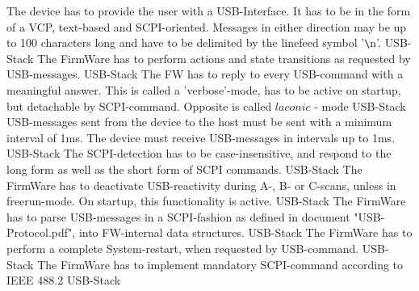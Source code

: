 	{	\scriptsize
		
	}





	{  The device has to provide the user with a USB-Interface. It has to be in the form of a VCP, text-based and SCPI-oriented.
		Messages in either direction may be up to 100 characters long and have to be delimited by the linefeed symbol '\texttt{\textbackslash}n'.	}
	{}{}{}{USB-Stack}
	{ The FirmWare has to perform actions and state transitions as requested by USB-messages.}
	{}{}{}{USB-Stack}
	{ The FW has to reply to every USB-command with a meaningful answer. This is called a 'verbose'-mode, has to be active on startup, but detachable by SCPI-command. Opposite is called $laconic$ - mode }
	{}{}{}{USB-Stack}
	{ USB-messages sent from the device to the host must be sent with a minimum interval of 1ms. The device must receive USB-messages in intervals up to 1ms.}
	{}{}{}{USB-Stack}
	{  The SCPI-detection has to be case-insensitive, and respond to the long form as well as the short form of SCPI commands.}
	{}{}{}	{USB-Stack}
	{	The FirmWare has to deactivate USB-reactivity during  A-, B- or C-scans, unless in freerun-mode.
		On startup, this functionality is active.	}
	{}{}{}{USB-Stack}
	{ The FirmWare has to parse USB-messages in a SCPI-fashion as defined in document "USB-Protocol.pdf", into FW-internal data structures.}
	{}{}{}{USB-Stack}
	{ The FirmWare has to perform a complete System-restart, when requested by USB-command.}
	{}{}{}{USB-Stack}
	{ The FirmWare has to implement mandatory SCPI-command according to IEEE 488.2}
	{}{}{}{USB-Stack}


